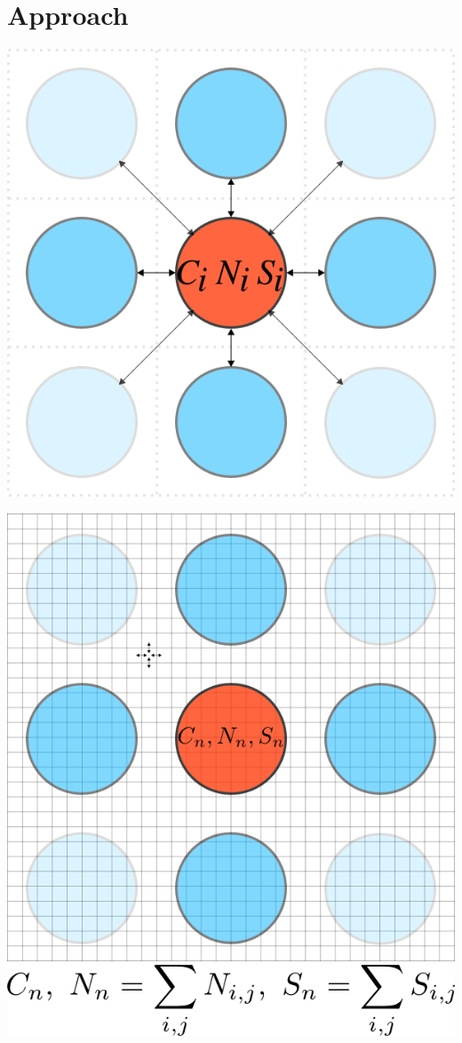\graphicspath{{images_low_res/}}
\section{Approach}
\label{sec:approach}


\begin{Figure}
  \centering
  \includegraphics[width=\linewidth]{square_array}
\end{Figure}

\begin{Figure}
  \centering
  \includegraphics[width=\linewidth]{square_array_grid}
\end{Figure}

